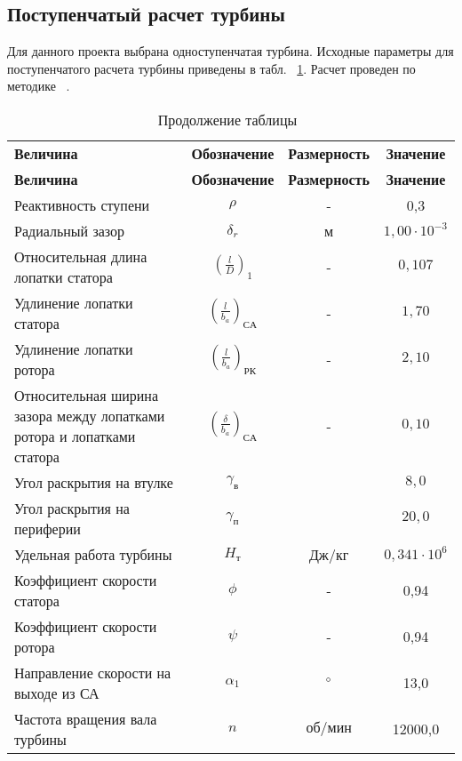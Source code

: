 \subsection{Поступенчатый расчет турбины}
Для данного проекта выбрана одноступенчатая турбина.
Исходные параметры для поступенчатого расчета турбины приведены в табл. ~\ref{turbine:midline_inlet}.
Расчет проведен по методике ~\cite{gtd_theory_text_book, mikhaltsev_1, mikhaltsev_2}.
\begin{center}
	\begin{longtable}{|p{4cm}|c|c|c|}
		\caption{Исходные параметры поступенчатого расчета турбины}
		\label{turbine:midline_inlet}
		\endfirsthead
		\caption*{\tabcapalign Продолжение таблицы~\thetable}\\[-0.45\onelineskip]
		\hline
		\textbf{Величина} & \textbf{Обозначение} & \textbf{Размерность} & \textbf{Значение} \\ \hline
		\endhead
		\hline
		\textbf{Величина} & \textbf{Обозначение} & \textbf{Размерность} & \textbf{Значение} \\ \hline
			Реактивность ступени & $\rho$ & - & 0,3  \\ \hline
			Радиальный зазор & $\delta_r$ & м & $1,00 \cdot 10^{-3}$ \\ \hline
			Относительная длина лопатки статора & $\left( \frac{l}{D} \right)_1$ & - & $0,107$ \\ \hline
			Удлинение лопатки статора & $\left( \frac{l}{b_a} \right)_{СА}$ & - & $1,70$ \\ \hline
			Удлинение лопатки ротора & $\left( \frac{l}{b_a} \right)_{РК}$ & - & $2,10$ \\ \hline
			Относительная ширина зазора между лопатками ротора и лопатками статора & $\left( \frac{\delta}{b_a} \right)_{СА}$ & - & $0,10$ \\ \hline
			Угол раскрытия на втулке & $\gamma_{в}$ & \degree & $8,0$ \\ \hline
			Угол раскрытия на периферии & $\gamma_{п}$ & \degree & $20,0$ \\ \hline
			Удельная работа турбины & $H_т$ & Дж/кг & $0,341 \cdot 10^6$ \\ \hline
			Коэффициент скорости статора & $\phi$ & - & 0,94 \\ \hline
			Коэффициент скорости ротора & $\psi$ & - & 0,94 \\ \hline
			Направление скорости на выходе из СА & $\alpha_1$ & $\degree$ & 13,0 \\ \hline
			Частота вращения вала турбины & $n$ & $об/мин$ & 12000,0 \\ \hline
	\end{longtable}
\end{center}

